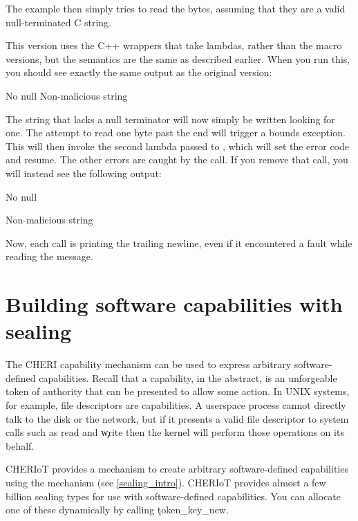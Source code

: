The example then simply tries to read the bytes, assuming that they are a valid null-terminated C string.

\codelisting[marker=safe_uart,caption=Using structured error handling to ensure that a function does not crash.,label=lst:safeuartyolo, filename=examples/yolo_arguments/uart.cc]{}

This version uses the C++ wrappers that take lambdas, rather than the macro versions, but the semantics are the same as described earlier.
When you run this, you should see exactly the same output as the original version:

\begin{console}
No null
Non-malicious string
\end{console}

The string that lacks a null terminator will now simply be written looking for one.
The attempt to read one byte past the end will trigger a bounds exception.
This will then invoke the second lambda passed to , which will set the error code and resume.
The other errors are caught by the  call.
If you remove that call, you will instead see the following output:

\begin{console}
No null


Non-malicious string
\end{console}

Now, each call is printing the trailing newline, even if it encountered a fault while reading the message.

\section[label=software_capabilities]{Building software capabilities with sealing}

The CHERI capability mechanism can be used to express arbitrary software-defined capabilities.
Recall that a capability, in the abstract, is an unforgeable token of authority that can be presented to allow some action.
In UNIX systems, for example, file descriptors are capabilities.
A userspace process cannot directly talk to the disk or the network, but if it presents a valid file descriptor to system calls such as \c{read} and \c{write} then the kernel will perform those operations on its behalf.

CHERIoT provides a mechanism to create arbitrary software-defined capabilities using the  mechanism (see \ref{sealing_intro}).
CHERIoT provides almost a few billion sealing types for use with software-defined capabilities.
You can allocate one of these dynamically by calling \c{token_key_new}.

